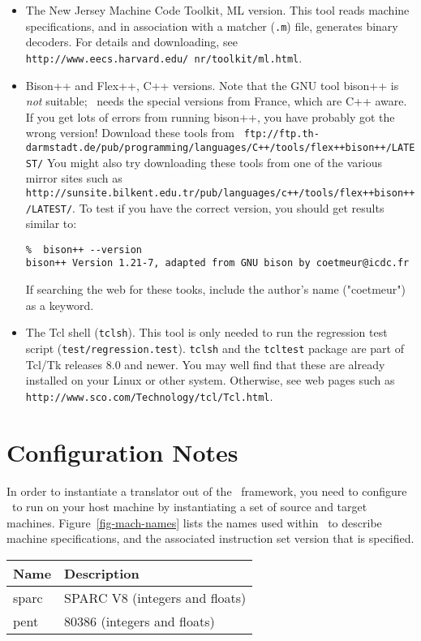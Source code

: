 \begin{itemize}
\item The New Jersey Machine Code Toolkit, ML version. This tool reads machine
specifications, and in association with a matcher (\texttt{.m}) file, generates
binary decoders. For details and downloading, see
\texttt{http://www.eecs.harvard.edu/~nr/toolkit/ml.html}.
\item Bison++ and Flex++, C++ versions. Note that the GNU tool bison++ is
{\it not} suitable; \walk\ needs the special versions from France, which are
C++ aware. If you get lots of errors from running bison++, you have probably
got the wrong version! Download these tools from
\texttt{ ftp://ftp.th-darmstadt.de/pub/programming/languages/C++/tools/flex++bison++/LATEST/}
You might also try downloading these tools from one of the various mirror sites such as
\texttt{http://sunsite.bilkent.edu.tr/pub/languages/c++/tools/flex++bison++/LATEST/}.
To test if you have the correct version, you should get results similar to:
\begin{verbatim}
%  bison++ --version
bison++ Version 1.21-7, adapted from GNU bison by coetmeur@icdc.fr
\end{verbatim}
If searching the web for these tooks, include the author's name ("coetmeur")
as a keyword.
\item The Tcl shell (\texttt{tclsh}). This tool is only needed to run the
regression test script (\texttt{test/regression.test}).
\texttt{tclsh} and the \texttt{tcltest} package are part of
Tcl/Tk releases 8.0 and newer.
You may well find that these are already installed on
your Linux or other system. Otherwise, see web pages such as
\texttt{http://www.sco.com/Technology/tcl/Tcl.html}.
\end{itemize}


\section{Configuration Notes}
In order to instantiate a translator out of the \walk\ framework, 
you need to configure \walk\ to run on your host machine by instantiating 
a set of source and target machines.  Figure~\ref{fig-mach-names} 
lists the names used within \walk\ to describe machine specifications, and 
the associated instruction set version that is specified.  

\centerfigbegin
\begin{tabular}{|l|l|} \hline
Name	& Description \\ \hline
sparc	& SPARC V8 (integers and floats) \\
pent	& 80386 (integers and floats) \\ \hline
\end{tabular}

